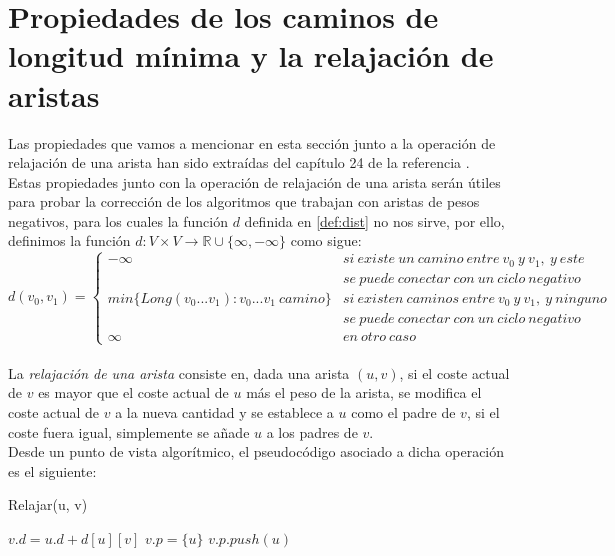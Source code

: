 \section{Propiedades de los caminos de longitud mínima y la relajación de aristas}\label{sec:2.2}

Las propiedades que vamos a mencionar en esta sección junto a la operación de relajación de una arista han sido extraídas del capítulo 24 de la referencia \cite{algorithms}. \\

Estas propiedades junto con la operación de relajación de una arista serán útiles para probar la corrección de los algoritmos que trabajan con aristas de pesos negativos, para los cuales la función $d$ definida en \autoref{def:dist} no nos sirve, por ello, definimos la función $d:V\times V \rightarrow \mathbb{R}\cup \{\infty,-\infty\}$ como sigue:
$$d(v_0,v_1)= \left\{ \begin{array}{lcc}
	-\infty & si\ existe\ un\ camino\ entre\ v_0\ y\ v_1,\ y\ este\\ & se\ puede\ conectar\ con\ un\ ciclo\ negativo
	\\ min\{Long(v_0...v_1) : v_0...v_1\ camino\} &   si\ existen\ caminos\ entre\ v_0\ y\ v_1,\ y\ ninguno\\ & se\ puede\ conectar\ con\ un\ ciclo\ negativo
	\\ \infty &  en\ otro\ caso
\end{array}
\right.$$ \\


La \textit{relajación de una arista} consiste en, dada una arista $(u,v)$, si el coste actual de $v$ es mayor que el coste actual de $u$ más el peso de la arista, se modifica el coste actual de $v$ a la nueva cantidad y se establece a $u$ como el padre de $v$, si el coste fuera igual, simplemente se añade $u$ a los padres de $v$. \\

Desde un punto de vista algorítmico, el pseudocódigo asociado a dicha operación es el siguiente:

\begin{breakablealgorithm}
	\caption{Relajar(u, v)}
	\begin{algorithmic}[1]
			\State $v.d = u.d + d[u][v]$
			\State $v.p = \{u\}$
			\State $v.p.push(u)$
		\EndIf
	\end{algorithmic}
\end{breakablealgorithm}

